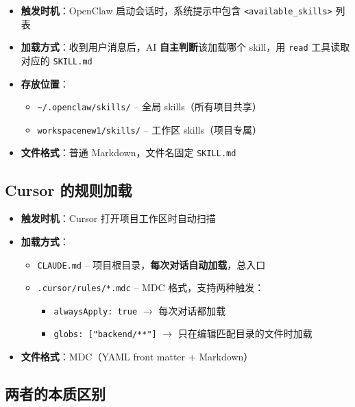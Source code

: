 \documentclass[11pt,a4paper]{article}
\begin{document}
\begin{itemize}[nosep]
  \item \textbf{触发时机}：OpenClaw 启动会话时，系统提示中包含 \texttt{<available\_skills>} 列表
  \item \textbf{加载方式}：收到用户消息后，AI \textbf{自主判断}该加载哪个 skill，用 \texttt{read} 工具读取对应的 \texttt{SKILL.md}
  \item \textbf{存放位置}：
    \begin{itemize}[nosep]
      \item \texttt{\textasciitilde/.openclaw/skills/} -- 全局 skills（所有项目共享）
      \item \texttt{workspacenew1/skills/} -- 工作区 skills（项目专属）
    \end{itemize}
  \item \textbf{文件格式}：普通 Markdown，文件名固定 \texttt{SKILL.md}
\end{itemize}

\subsection{Cursor 的规则加载}

\begin{itemize}[nosep]
  \item \textbf{触发时机}：Cursor 打开项目工作区时自动扫描
  \item \textbf{加载方式}：
    \begin{itemize}[nosep]
      \item \texttt{CLAUDE.md} -- 项目根目录，\textbf{每次对话自动加载}，总入口
      \item \texttt{.cursor/rules/*.mdc} -- MDC 格式，支持两种触发：
        \begin{itemize}[nosep]
          \item \texttt{alwaysApply: true} $\to$ 每次对话都加载
          \item \texttt{globs: ["backend/**"]} $\to$ 只在编辑匹配目录的文件时加载
        \end{itemize}
    \end{itemize}
  \item \textbf{文件格式}：MDC（YAML front matter + Markdown）
\end{itemize}

\subsection{两者的本质区别}
\end{document}
